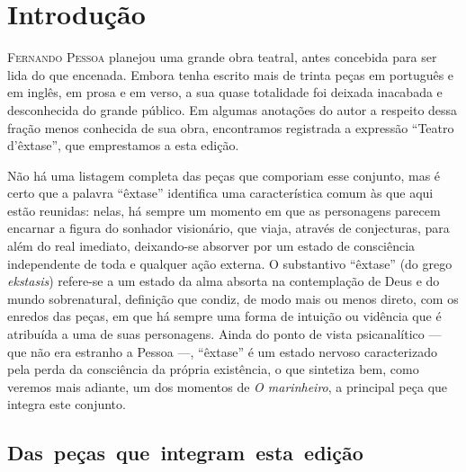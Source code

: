 \chapter[Introdução, \emph{por Caio Gagliardi}]{Introdução}

\textsc{Fernando Pessoa} planejou uma grande obra teatral, antes concebida para
ser lida do que encenada. Embora tenha escrito mais de trinta peças em
português e em inglês, em prosa e em verso, a sua quase totalidade foi
deixada inacabada e desconhecida do grande público. Em algumas
anotações do autor a respeito dessa fração menos conhecida de sua obra,
encontramos registrada a expressão “Teatro d’êxtase”, que emprestamos a
esta edição. 

Não há uma listagem completa das peças que comporiam esse conjunto, mas é certo
que a palavra “êxtase” identifica uma característica comum às que aqui
estão reunidas: nelas, há sempre um momento em que as personagens
parecem encarnar a figura do sonhador visionário, que viaja, através de
conjecturas, para além do real imediato, deixando-se absorver por um
estado de consciência independente de toda e qualquer ação externa. O
substantivo “êxtase” (do grego \textit{ekstasis}) refere-se a um estado
da alma absorta na contemplação de Deus e do mundo sobrenatural,
definição que condiz, de modo mais ou menos direto, com os enredos das
peças, em que há sempre uma forma de intuição ou vidência que é
atribuída a uma de suas personagens. Ainda do ponto de vista
psicanalítico --- que não era estranho a Pessoa ---, “êxtase” é um estado
nervoso caracterizado pela perda da consciência da própria existência,
o que sintetiza bem, como veremos mais adiante, um dos momentos de
\textit{O marinheiro}, a principal peça que integra este conjunto.

\section{\mbox{Das peças que integram esta edição}}

